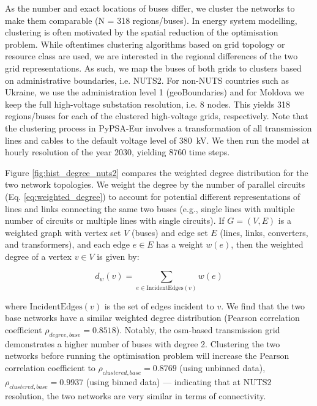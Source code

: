 \documentclass[fleqn,10pt]{wlscirep}
\let\autocite\cite
\begin{document}
As the number and exact locations of buses differ, we cluster the networks to make them comparable (N = 318 regions/buses). In energy system modelling, clustering is often motivated by the spatial reduction of the optimisation problem. While oftentimes clustering algorithms based on grid topology or resource class are used, \autocite{frysztackiComparisonClusteringMethods2022} we are interested in the regional differences of the two grid representations. As such, we map the buses of both grids to clusters based on administrative boundaries, i.e. NUTS2. For non-NUTS countries such as Ukraine, we use the administration level 1 (geoBoundaries\autocite{runfolaGeoBoundariesGlobalDatabase2020}) and for Moldova we keep the full high-voltage substation resolution, i.e. 8 nodes. This yields 318 regions/buses for each of the clustered high-voltage grids, respectively. Note that the clustering process in PyPSA-Eur involves a transformation of all transmission lines and cables to the default voltage level of \SI{380}{\kilo\volt}. We then run the model at hourly resolution of the year 2030, yielding 8760 time steps. 

Figure \ref{fig:hist_degree_nuts2} compares the weighted degree distribution for the two network topologies. We weight the degree by the number of parallel circuits (Eq. \ref{eq:weighted_degree}) to account for potential different representations of lines and links connecting the same two buses (e.g., single lines with multiple number of circuits or multiple lines with single circuits). If \( G = (V, E) \) is a weighted graph with vertex set \( V \) (buses) and edge set \( E \) (lines, links, converters, and transformers), and each edge \( e \in E \) has a weight \( w(e) \), then the weighted degree of a vertex \( v \in V \) is given by:

\begin{equation}
    d_w(v) = \sum_{e \in \text{IncidentEdges}(v)} w(e)
    \label{eq:weighted_degree}
\end{equation}

where \( \text{IncidentEdges}(v) \) is the set of edges incident to \( v \). We find that the two base networks have a similar weighted degree distribution (Pearson correlation coefficient $\rho_{degree,base} = 0.8518$). Notably, the \acrshort{osm}-based transmission grid demonstrates a higher number of buses with degree 2. Clustering the two networks before running the optimisation problem will increase the Pearson correlation coefficient to $\rho_{clustered,base} = 0.8769$ (using unbinned data), $\rho_{clustered,base} = 0.9937$ (using binned data) --- indicating that at NUTS2 resolution, the two networks are very similar in terms of connectivity.
\end{document}
